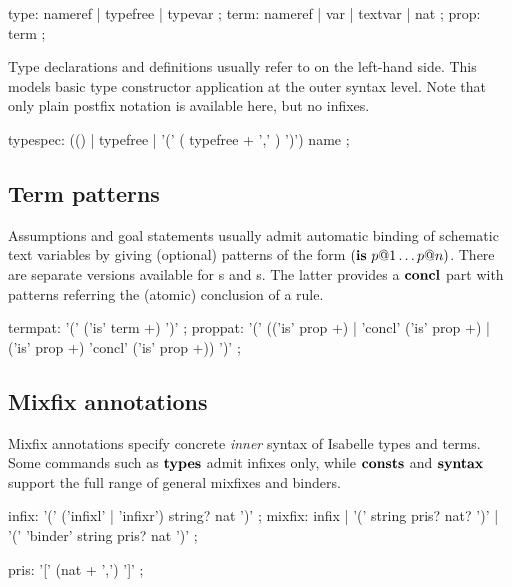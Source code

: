\begin{rail}
  type: nameref | typefree | typevar
  ;
  term: nameref | var | textvar | nat
  ;
  prop: term
  ;
\end{rail}

Type declarations and definitions usually refer to  on
the left-hand side.  This models basic type constructor application at the
outer syntax level.  Note that only plain postfix notation is available here,
but no infixes.

\begin{rail}
  typespec: (() | typefree | '(' ( typefree + ',' ) ')') name
  ;
\end{rail}


\subsection{Term patterns}

Assumptions and goal statements usually admit automatic binding of schematic
text variables by giving (optional) patterns of the form $({\mathord{\mathbf{is}}}~p@1 \dots p@n)$.
There are separate versions available for s and
s.  The latter provides a ${\mathord{\mathbf{concl}}}$ part with patterns
referring the (atomic) conclusion of a rule.

\begin{rail}
  termpat: '(' ('is' term +) ')'
  ;
  proppat: '(' (('is' prop +) | 'concl' ('is' prop +) | ('is' prop +) 'concl' ('is' prop +)) ')'
  ;
\end{rail}


\subsection{Mixfix annotations}

Mixfix annotations specify concrete \emph{inner} syntax of Isabelle types and
terms.  Some commands such as ${\mathord{\mathbf{types}}}$ admit infixes only, while ${\mathord{\mathbf{consts}}}$ and
${\mathord{\mathbf{syntax}}}$ support the full range of general mixfixes and binders.

\begin{rail}
  infix: '(' ('infixl' | 'infixr') string? nat ')'
  ;
  mixfix: infix | '(' string pris? nat? ')' | '(' 'binder' string pris? nat ')'
  ;

  pris: '[' (nat + ',') ']'
  ;
\end{rail}


